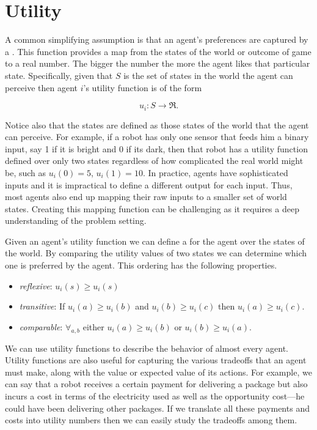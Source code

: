 \section{Utility}

A common simplifying assumption is that an agent's preferences are
captured by a .  This function provides a map
from the states of the world or outcome of game to a real number.
 The bigger the number the more the agent likes that
particular state.  Specifically, given that $S$ is the set of states
in the world the agent can perceive then agent $i$'s utility function
is of the form

\begin{equation}
  \label{eq:utility}
  u_i : S \rightarrow \Re.
\end{equation}

Notice also that the states are defined as those states of the world
that the agent can perceive. For example, if a robot has only one
sensor that feeds him a binary input, say 1 if it is bright and 0 if
its dark, then that robot has a utility function defined over only two
states regardless of how complicated the real world might be, such as
$u_i(0) = 5$, $u_i(1) = 10$. In practice, agents have sophisticated
inputs and it is impractical to define a different output for each
input. Thus, most agents also end up mapping their raw inputs to a
smaller set of world states. Creating this mapping function can be
challenging as it requires a deep understanding of the problem
setting.

Given an agent's utility function we can define a  for the agent over the states of the world.  By comparing
the utility values of two states we can determine which one is
preferred by the agent. This ordering has the following properties.
\begin{itemize}
\item \emph{reflexive}: $u_i(s) \geq u_i(s)$
  
\item \emph{transitive}: If $u_i(a) \geq u_i(b)$ and $u_i(b) \geq u_i(c)$ then $u_i(a) \geq u_i(c)$.
  
\item \emph{comparable}: $\forall_{a,b}$
  either $u_i(a) \geq u_i(b)$ or $u_i(b) \geq u_i(a)$. 
\end{itemize} 

We can use utility functions to describe the behavior of almost every
agent. Utility functions are also useful for capturing the various
tradeoffs that an agent must make, along with the value or expected
value of its actions. For example, we can say that a robot receives a
certain payment for delivering a package but also incurs a cost in
terms of the electricity used as well as the opportunity cost---he
could have been delivering other packages. If we translate all these
payments and costs into utility numbers then we can easily study the
tradeoffs among them.

